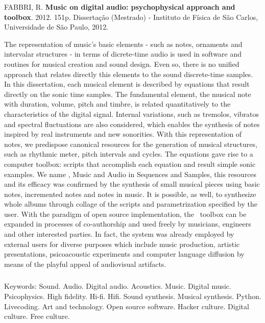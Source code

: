 \afterpage{\blankpage}

\begin{abstract2}
\vspace{-10mm}
FABBRI, R. \textbf{Music on digital audio: psychophysical approach and toolbox}. 2012. 151p. Dissertação (Mestrado) - Instituto de Física de São Carlos, Universidade de São Paulo, 2012.
\vspace{15mm}

The representation of music's basic elements - such as notes, ornaments and intervalar structures - in terms of dicrete-time audio is used in software and routines for musical creation and sound design. Even so, there is no unified approach that relates directly this elements to the sound discrete-time samples. In this dissertation, each musical element is described by equations that result directly on the sonic time samples. The fundamental element, the musical note with duration, volume, pitch and timbre, is related quantitatively to the characteristics of the digital signal. Internal variations, such as tremolos, vibratos and spectral fluctuations are also considered, which enables the synthesis of notes inspired by real instruments and new sonorities. With this representation of notes, we predispose canonical resources for the generation of musical structures, such as rhythmic meter, pitch intervals and cycles. The equations gave rise to a computer toolbox: scripts that accomplish each equation and result simple sonic examples. We name \mass, Music and Audio in Sequences and Samples, this resources and its efficacy was confirmed by the synthesis of small musical pieces using basic notes, incremented notes and notes in music. It is possible, as well, to synthesize whole albums through collage of the scripts and parametrization specified by the user. With the paradigm of open source implementation, the \mass\ toolbox can be expanded in processes of co-authorship and used freely by musicians, engineers and other interested parties. In fact, the system was already employed by external users for diverse purposes which include music production, artistic presentations, psicoacoustic experiments and computer language diffusion by means of the playful appeal of audiovisual artifacts.



$\phantom{linha em branco}$\\
Keywords: Sound. Audio. Digital audio. Acoustics. Music. Digital music. Psicophysics. High fidelity. Hi-fi. Hifi. Sound synthesis. Musical synthesis. Python. Livecoding. Art and technology. Open source software. Hacker culture. Digital culture. Free culture.


\end{abstract2}
